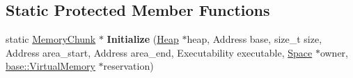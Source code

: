 \subsection*{Static Protected Member Functions}
\begin{DoxyCompactItemize}
\item 
static \hyperlink{classv8_1_1internal_1_1_memory_chunk}{Memory\+Chunk} $\ast$ {\bfseries Initialize} (\hyperlink{classv8_1_1internal_1_1_heap}{Heap} $\ast$heap, Address base, size\+\_\+t size, Address area\+\_\+start, Address area\+\_\+end, Executability executable, \hyperlink{classv8_1_1internal_1_1_space}{Space} $\ast$owner, \hyperlink{classv8_1_1base_1_1_virtual_memory}{base\+::\+Virtual\+Memory} $\ast$reservation)\hypertarget{classv8_1_1internal_1_1_memory_chunk_ae997a6d0172e6245a6d93c1f25991fa2}{}\label{classv8_1_1internal_1_1_memory_chunk_ae997a6d0172e6245a6d93c1f25991fa2}

\end{DoxyCompactItemize}
